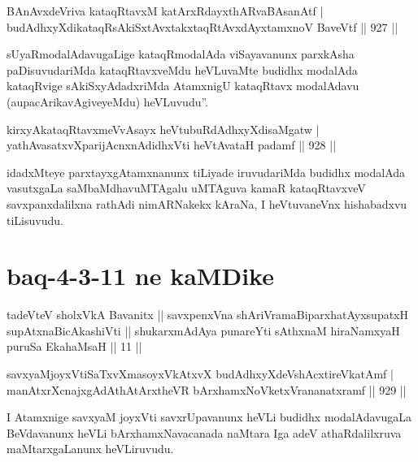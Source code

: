 
\begin{shl}
BAnAvxdeVriva kataqRtavxM katArxRdayxthARvaBAsanAtf | \\
budAdhxyXdikataqRsAkiSxtAvxtakxtaqRtAvxdAyxtamxnoV BaveVtf \hfill||  927 ||  
\end{shl}

\begin{artha}
sUyaRmodalAdavugaLige kataqRmodalAda viSayavanunx parxkAsha paDisuvudariMda kataqRtavxveMdu heVLuvaMte budidhx modalAda kataqRvige sAkiSxyAdadxriMda AtamxnigU kataqRtavx modalAdavu (aupacArikavAgiveyeMdu) heVLuvudu''.
\end{artha}


\begin{shl}
kirxyAkataqRtavxmeVvAsayx heVtubuRdAdhxyXdisaMgatw | \\
yathAvasatxvXparijAcnxnAdidhxVti heVtAvataH padamf \hfill||  928 ||  
\end{shl}

\begin{artha}
idadxMteye parxtayxgAtamxnanunx tiLiyade iruvudariMda budidhx modalAda vasutxgaLa saMbaMdhavuMTAgalu uMTAguva kamaR kataqRtavxveV savxpanxdalilxna rathAdi nimARNakekx  kAraNa, I heVtuvaneVnx hishabadxvu tiLisuvudu.
\end{artha}

\section*{baq-4-3-11 ne kaMDike}

\begin{shl}
tadeVteV sholxVkA Bavanitx || savxpenxVna shAriVramaBiparxhatAyxsupatxH supAtxnaBicAkashiVti || shukarxmAdAya punareYti sAthxnaM hiraNamxyaH puruSa EkahaMsaH || 11 ||
\end{shl}


\begin{shl}
savxyaMjoyxVtiSaTxvXmasoyxVkAtxvX budAdhxyXdeVshAcxtireVkatAmf | \\
manAtxrXcnajxgAdAthAtArxtheVR bArxhamxNoVketxVrananatxramf \hfill||  929 ||  
\end{shl}

\begin{artha}
I Atamxnige savxyaM joyxVti savxrUpavanunx heVLi budidhx modalAdavugaLa BeVdavanunx heVLi bArxhamxNavacanada naMtara Iga adeV athaRdalilxruva maMtarxgaLanunx heVLiruvudu.
\end{artha}

